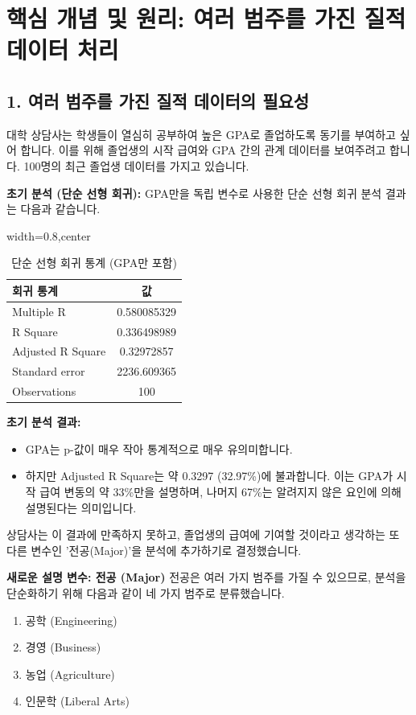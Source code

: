 \documentclass[11pt,a4paper]{article}
\theoremstyle{definition}
\begin{document}
\newpage
\section{핵심 개념 및 원리: 여러 범주를 가진 질적 데이터 처리}

\subsection{1. 여러 범주를 가진 질적 데이터의 필요성}
대학 상담사는 학생들이 열심히 공부하여 높은 GPA로 졸업하도록 동기를 부여하고 싶어 합니다. 이를 위해 졸업생의 시작 급여와 GPA 간의 관계 데이터를 보여주려고 합니다. 100명의 최근 졸업생 데이터를 가지고 있습니다.

\textbf{초기 분석 (단순 선형 회귀):}
GPA만을 독립 변수로 사용한 단순 선형 회귀 분석 결과는 다음과 같습니다.

\begin{table}[htbp]
\centering
\caption{단순 선형 회귀 통계 (GPA만 포함)}
\label{tab:simple_reg_gpa}
\begin{adjustbox}{width=0.8\textwidth,center}
\begin{tabular}{lc}
\toprule
\textbf{회귀 통계} & \textbf{값} \\
\midrule
Multiple R & 0.580085329 \\
R Square & 0.336498989 \\
Adjusted R Square & 0.32972857 \\
Standard error & 2236.609365 \\
Observations & 100 \\
\bottomrule
\end{tabular}
\end{adjustbox}
\end{table}

\begin{summarybox}
\textbf{초기 분석 결과:}
\begin{itemize}
    \item GPA는 p-값이 매우 작아 통계적으로 매우 유의미합니다.
    \item 하지만 Adjusted R Square는 약 0.3297 (32.97\%)에 불과합니다. 이는 GPA가 시작 급여 변동의 약 33\%만을 설명하며, 나머지 67\%는 알려지지 않은 요인에 의해 설명된다는 의미입니다.
\end{itemize}
상담사는 이 결과에 만족하지 못하고, 졸업생의 급여에 기여할 것이라고 생각하는 또 다른 변수인 '전공(Major)'을 분석에 추가하기로 결정했습니다.
\end{summarybox}

\textbf{새로운 설명 변수: 전공 (Major)}
전공은 여러 가지 범주를 가질 수 있으므로, 분석을 단순화하기 위해 다음과 같이 네 가지 범주로 분류했습니다.
\begin{enumerate}
    \item 공학 (Engineering)
    \item 경영 (Business)
    \item 농업 (Agriculture)
    \item 인문학 (Liberal Arts)
\end{enumerate}
\end{document}

